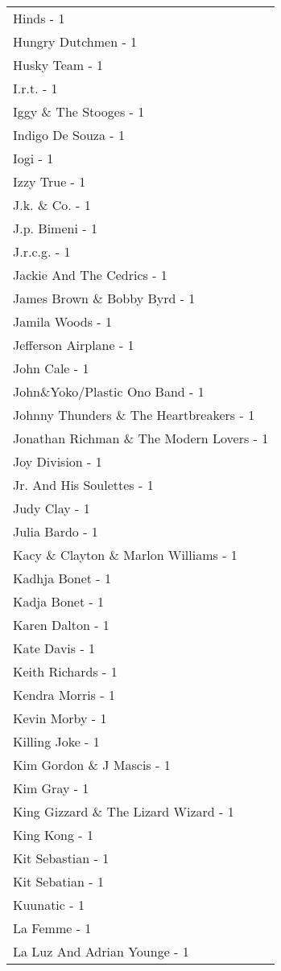 \documentclass[
]{article}
\begin{document}
\begin{longtable}{l}
Hinds - 1 \\ 
Hungry Dutchmen - 1 \\ 
Husky Team - 1 \\ 
I.r.t. - 1 \\ 
Iggy \& The Stooges - 1 \\ 
Indigo De Souza - 1 \\ 
Iogi - 1 \\ 
Izzy True - 1 \\ 
J.k. \& Co. - 1 \\ 
J.p. Bimeni - 1 \\ 
J.r.c.g. - 1 \\ 
Jackie And The Cedrics - 1 \\ 
James Brown \& Bobby Byrd - 1 \\ 
Jamila Woods - 1 \\ 
Jefferson Airplane - 1 \\ 
John Cale - 1 \\ 
John\&Yoko/Plastic Ono Band - 1 \\ 
Johnny Thunders \& The Heartbreakers - 1 \\ 
Jonathan Richman \& The Modern Lovers - 1 \\ 
Joy Division - 1 \\ 
Jr. And His Soulettes - 1 \\ 
Judy Clay - 1 \\ 
Julia Bardo - 1 \\ 
Kacy \& Clayton \& Marlon Williams - 1 \\ 
Kadhja Bonet - 1 \\ 
Kadja Bonet - 1 \\ 
Karen Dalton - 1 \\ 
Kate Davis - 1 \\ 
Keith Richards - 1 \\ 
Kendra Morris - 1 \\ 
Kevin Morby - 1 \\ 
Killing Joke - 1 \\ 
Kim Gordon \& J Mascis - 1 \\ 
Kim Gray - 1 \\ 
King Gizzard \& The Lizard Wizard - 1 \\ 
King Kong - 1 \\ 
Kit Sebastian - 1 \\ 
Kit Sebatian - 1 \\ 
Kuunatic - 1 \\ 
La Femme - 1 \\ 
La Luz And Adrian Younge - 1 \\ 

\end{longtable}
\end{document}
